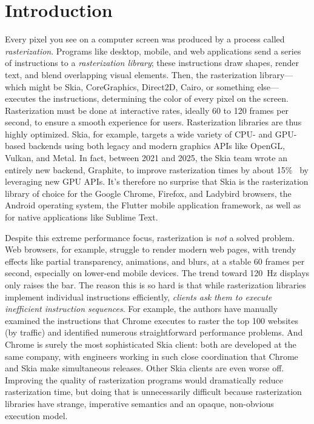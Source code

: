 \documentclass[main.tex]{subfiles}
\begin{document}
\section{Introduction}
\label{sec:intro}

Every pixel you see on a computer screen
  was produced by a process called \emph{rasterization}.
Programs like desktop, mobile, and web applications
  send a series of instructions to a \emph{rasterization library};
  these instructions draw shapes, render text,
  and blend overlapping visual elements.
Then, the rasterization library---%
  which might be Skia, CoreGraphics, Direct2D, Cairo, or something else---%
  executes the instructions,
  determining the color of every pixel on the screen.
Rasterization must be done at interactive rates,
  ideally 60 to 120 frames per second,
  to ensure a smooth experience for users.
Rasterization libraries are thus highly optimized.
Skia, for example, targets
  a wide variety of CPU- and GPU-based backends
  using both legacy and modern graphics APIs
  like OpenGL, Vulkan, and Metal.
In fact, between 2021 and 2025, the Skia team
  wrote an entirely new backend, Graphite,
  to improve rasterization times by about 15\%~\cite{graphite-blog-post}
  by leveraging new GPU APIs.
It's therefore no surprise
  that Skia is the rasterization library of choice for
  the Google Chrome, Firefox, and Ladybird browsers,
  the Android operating system, the Flutter mobile application framework,
  as well as for native applications like Sublime Text.

Despite this extreme performance focus,
  rasterization is \emph{not} a solved problem.
Web browsers, for example, struggle to render modern web pages,
  with trendy effects like partial transparency, animations, and blurs,
  at a stable 60 frames per second,
  especially on lower-end mobile devices.
The trend toward \SI{120}{Hz} displays only raises the bar.
The reason this is so hard is that
  while rasterization libraries implement individual instructions efficiently,
  \emph{clients ask them to execute inefficient instruction sequences}.
For example, the authors have manually examined
  the instructions that Chrome executes to raster the top 100 websites (by traffic)
  and identified numerous straightforward performance problems.
And Chrome is surely the most sophisticated Skia client:
  both are developed at the same company,
  with engineers working in such close coordination
  that Chrome and Skia make simultaneous releases.
Other Skia clients are even worse off.
Improving the quality of rasterization programs
  would dramatically reduce rasterization time,
  but doing that is unnecessarily difficult
  because rasterization libraries have strange, imperative semantics
  and an opaque, non-obvious execution model.
\end{document}
